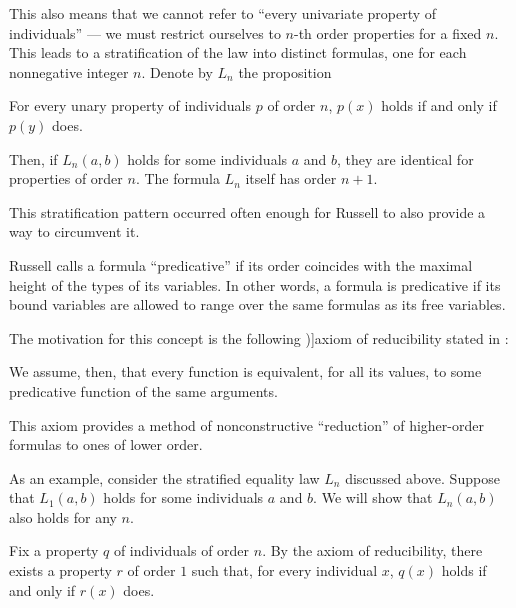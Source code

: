 \begin{concept}
\begin{thmenum}
    This also means that we cannot refer to \enquote{every univariate property of individuals} --- we must restrict ourselves to \( n \)-th order properties for a fixed \( n \). This leads to a stratification of the law into distinct formulas, one for each nonnegative integer \( n \). Denote by \( L_n \) the proposition
    \begin{displayquote}
      For every unary property of individuals \( p \) of order \( n \), \( p(x) \) holds if and only if \( p(y) \) does.
    \end{displayquote}

    Then, if \( L_n(a, b) \) holds for some individuals \( a \) and \( b \), they are identical for properties of order \( n \). The formula \( L_n \) itself has order \( n + 1 \).

    This stratification pattern occurred often enough for Russell to also provide a way to circumvent it.

     Russell calls a formula \enquote{predicative} if its order coincides with the maximal height of the types of its  variables. In other words, a formula is predicative if its bound variables are allowed to range over the same formulas as its free variables.

    The motivation for this concept is the following \term[en=axiom of reducibility (\cite[241]{Russell1908TypeTheory})]{axiom of reducibility} stated in \cite[241]{Russell1908TypeTheory}:
    \begin{displayquote}
      We assume, then, that every function is equivalent, for all its values, to some predicative function of the same arguments.
    \end{displayquote}

    This axiom provides a method of nonconstructive \enquote{reduction} of higher-order formulas to ones of lower order.

    As an example, consider the stratified equality law \( L_n \) discussed above. Suppose that \( L_1(a, b) \) holds for some individuals \( a \) and \( b \). We will show that \( L_n(a, b) \) also holds for any \( n \).

    Fix a property \( q \) of individuals of order \( n \). By the axiom of reducibility, there exists a property \( r \) of order \( 1 \) such that, for every individual \( x \), \( q(x) \) holds if and only if \( r(x) \) does.


\end{thmenum}
\end{concept}
